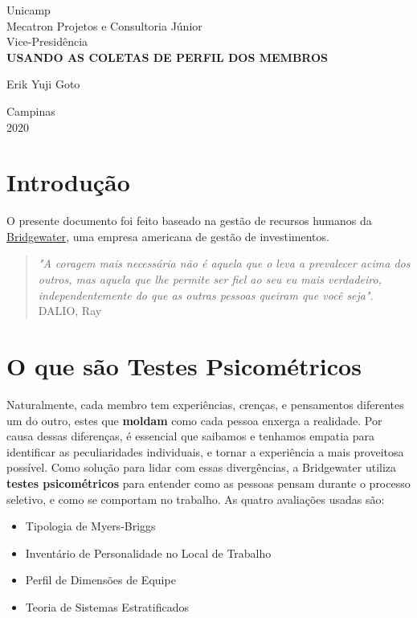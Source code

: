 \documentclass[a4paper, 12pt]{article}
\begin{document}
%
\begin{titlepage} %
	\begin{center} %
		{\large Unicamp}\\[0.2cm] %
		{\large Mecatron Projetos e Consultoria Júnior}\\[0.2cm] %
		{\large Vice-Presidência}\\[3.2cm]
		{\bf \huge USANDO AS COLETAS DE PERFIL DOS MEMBROS}\\[5.1cm] %
	\end{center} %
	{\large Erik Yuji Goto}\\[10cm] %
	\begin{center}
		{\large Campinas}\\[0.2cm]
		{\large 2020}
	\end{center}
\end{titlepage} %


\tableofcontents
\newpage

\section{Introdução}
O presente documento foi feito baseado na gestão de recursos humanos da \href{https://www.bridgewater.com/}{Bridgewater}, uma empresa americana de gestão de investimentos.\\

\begin{quote}
	\textit{"A coragem mais necessária não é aquela que o leva a prevalecer acima dos outros, mas aquela que lhe permite ser fiel ao seu eu mais verdadeiro, independentemente do que as outras pessoas queiram que você seja"}. DALIO, Ray
\end{quote}


\section{O que são Testes Psicométricos}
Naturalmente, cada membro tem experiências, crenças, e pensamentos diferentes um do outro, estes que \textbf{moldam} como cada pessoa enxerga a realidade. Por causa dessas diferenças, é essencial que saibamos e tenhamos empatia para identificar as peculiaridades individuais, e tornar a experiência a mais proveitosa possível.
Como solução para lidar com essas divergências, a Bridgewater utiliza \textbf{testes psicométricos} para entender como as pessoas pensam durante o processo seletivo, e como se comportam no trabalho. As quatro avaliações usadas são:
\begin{itemize}
	\item Tipologia de Myers-Briggs
	\item Inventário de Personalidade no Local de Trabalho
	\item Perfil de Dimensões de Equipe
	\item Teoria de Sistemas Estratificados
\end{itemize}
\end{document}
